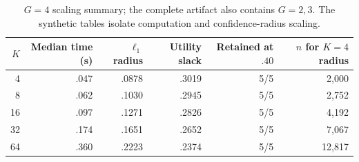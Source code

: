 \begin{table}[t]
\centering
\small
\setlength{\tabcolsep}{4.0pt}
\begin{tabular}{rrrrrr}
\hline
$K$ & Median time (s) & $\ell_1$ radius & Utility slack & Retained at $.40$ & $n$ for $K=4$ radius \\
\hline
4  & .047 & .0878 & .3019 & 5/5 & 2,000 \\
8  & .062 & .1030 & .2945 & 5/5 & 2,752 \\
16 & .097 & .1271 & .2826 & 5/5 & 4,192 \\
32 & .174 & .1651 & .2652 & 5/5 & 7,067 \\
64 & .360 & .2223 & .2374 & 5/5 & 12,817 \\
\hline
\end{tabular}
\caption{$G=4$ scaling summary; the complete artifact also contains $G=2,3$.
The synthetic tables isolate computation and confidence-radius scaling.}
\label{supp:tab:scaling}
\end{table}
